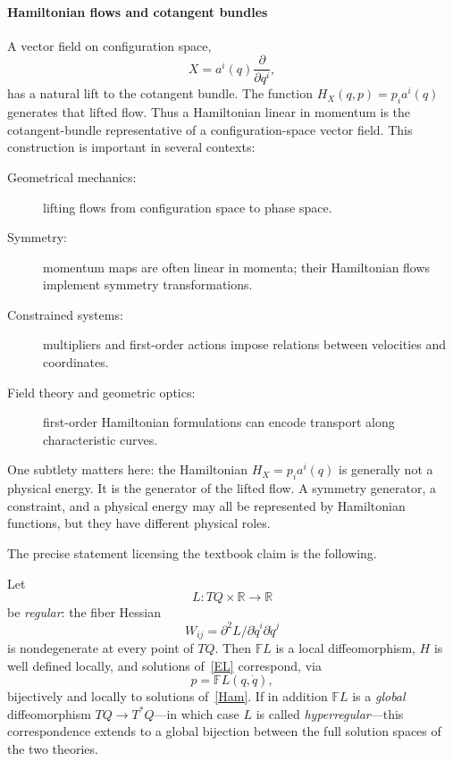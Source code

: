 \paragraph{Hamiltonian flows and cotangent bundles}
A vector field on configuration space,
\[X=a^i(q)\frac{\partial}{\partial q^i},\]
has a natural lift to the cotangent bundle. The function
\(H_X(q,p)=p_i a^i(q)\) generates that lifted flow.
Thus a Hamiltonian linear in momentum is the cotangent-bundle representative of
a configuration-space vector field.
This construction is important in several contexts:
\begin{description}
    \item [Geometrical mechanics:] lifting flows from configuration space to 
        phase space.
    \item [Symmetry:] momentum maps are often linear in momenta; their 
        Hamiltonian flows implement symmetry transformations.
    \item [Constrained systems:] multipliers and first-order actions impose 
        relations between velocities and coordinates.
    \item [Field theory and geometric optics:] first-order Hamiltonian 
        formulations can encode transport along characteristic curves.
\end{description}
 One subtlety matters here: the Hamiltonian \(H_X=p_i a^i(q)\) is generally not
a physical energy. It is the generator of the lifted flow. A symmetry
generator, a constraint, and a physical energy may all be represented by
Hamiltonian functions, but they have different physical roles.


The precise statement licensing the textbook claim is the following.
\begin{proposition}
\label{regular}
Let $$L: TQ\times\mathbb{R}\to\mathbb{R}$$
    be \emph{regular}: the fiber Hessian
    $$W_{ij} = \partial^2 L/\partial \dot q^i \partial \dot q^j$$
    is nondegenerate at every point of $TQ$. Then $\mathbb{F}L$ is a local
    diffeomorphism, $H$ is well defined locally, and solutions of~\eqref{EL}
    correspond, via 
    $$p = \mathbb{F}L(q,\dot q),$$ 
    bijectively and locally to
    solutions of~\eqref{Ham}. If in addition $\mathbb{F}L$ is a \emph{global}
    diffeomorphism $TQ \to T^*Q$---in which case $L$ is called
    \emph{hyperregular}---this correspondence extends to a global bijection
    between the full solution spaces of the two theories.
\end{proposition}

